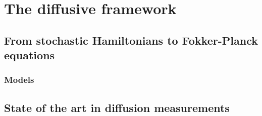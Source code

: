 
\chapter{The diffusive framework}\label{ch:the_diffusive_framework}

\section{From stochastic Hamiltonians to Fokker-Planck equations}

\subsection{Models}

\section{State of the art in diffusion measurements}